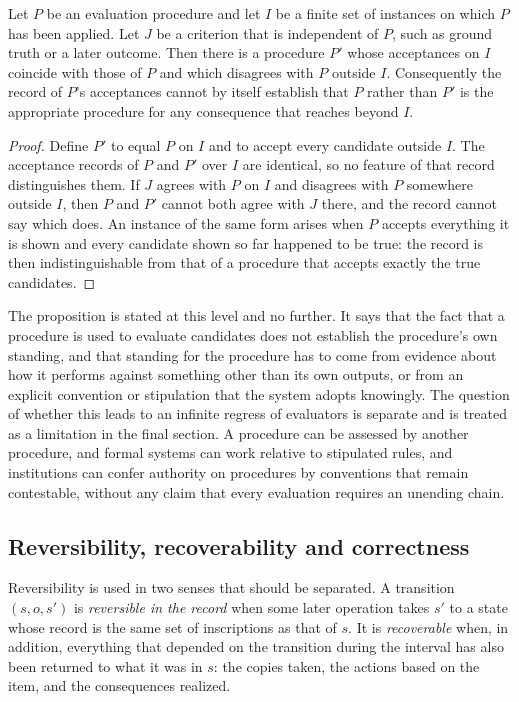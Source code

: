 \begin{proposition}\label{prop:three}
Let $P$ be an evaluation procedure and let $I$ be a finite set of instances on which $P$ has been applied. Let $J$ be a criterion that is independent of $P$, such as ground truth or a later outcome. Then there is a procedure $P'$ whose acceptances on $I$ coincide with those of $P$ and which disagrees with $P$ outside $I$. Consequently the record of $P$'s acceptances cannot by itself establish that $P$ rather than $P'$ is the appropriate procedure for any consequence that reaches beyond $I$.
\end{proposition}

\begin{proof}
Define $P'$ to equal $P$ on $I$ and to accept every candidate outside $I$. The acceptance records of $P$ and $P'$ over $I$ are identical, so no feature of that record distinguishes them. If $J$ agrees with $P$ on $I$ and disagrees with $P$ somewhere outside $I$, then $P$ and $P'$ cannot both agree with $J$ there, and the record cannot say which does. An instance of the same form arises when $P$ accepts everything it is shown and every candidate shown so far happened to be true: the record is then indistinguishable from that of a procedure that accepts exactly the true candidates.
\end{proof}

The proposition is stated at this level and no further. It says that the fact that a procedure is used to evaluate candidates does not establish the procedure's own standing, and that standing for the procedure has to come from evidence about how it performs against something other than its own outputs, or from an explicit convention or stipulation that the system adopts knowingly. The question of whether this leads to an infinite regress of evaluators is separate and is treated as a limitation in the final section. A procedure can be assessed by another procedure, and formal systems can work relative to stipulated rules, and institutions can confer authority on procedures by conventions that remain contestable, without any claim that every evaluation requires an unending chain.

\subsection*{Reversibility, recoverability and correctness}

Reversibility is used in two senses that should be separated. A transition $(s,o,s')$ is \emph{reversible in the record} when some later operation takes $s'$ to a state whose record is the same set of inscriptions as that of $s$. It is \emph{recoverable} when, in addition, everything that depended on the transition during the interval has also been returned to what it was in $s$: the copies taken, the actions based on the item, and the consequences realized.

